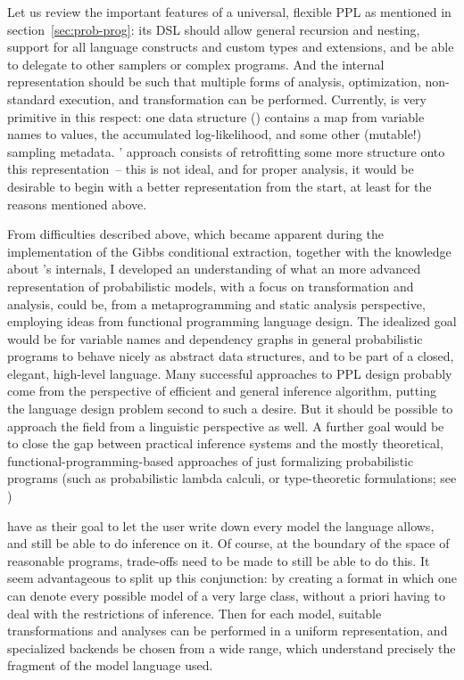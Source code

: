 Let us review the important features of a universal, flexible PPL as mentioned in
section~\ref{sec:prob-prog}: its DSL should allow general recursion and nesting, support for all
language constructs and custom types and extensions, and be able to delegate to other samplers or
complex programs.  And the internal representation should be such that multiple forms of analysis,
optimization, non-standard execution, and transformation can be performed.  Currently, \turingjl{}
is very primitive in this respect: one data structure () contains a map from variable
names to values, the accumulated log-likelihood, and some other (mutable!) sampling
metadata. \autogibbsjl{}' approach consists of retrofitting some more structure onto this
representation~-- this is not ideal, and for proper analysis, it would be desirable to begin with a
better representation from the start, at least for the reasons mentioned above.

From difficulties described above, which became apparent during the implementation of the Gibbs
conditional extraction, together with the knowledge about \dppljl{}'s internals, I developed an
understanding of what an more advanced representation of probabilistic models, with a focus on
transformation and analysis, could be, from a metaprogramming and static analysis perspective,
employing ideas from functional programming language design.  The idealized goal would be for
variable names and dependency graphs in general probabilistic programs to behave nicely as abstract
data structures, and to be part of a closed, elegant, high-level language.  Many successful
approaches to PPL design probably come from the perspective of efficient and general inference
algorithm, putting the language design problem second to such a desire.  But it should be possible
to approach the field from a linguistic perspective as well.  A further goal would be to close the
gap between practical inference systems and the mostly theoretical, functional-programming-based
approaches of just formalizing probabilistic programs (such as probabilistic lambda calculi, or
type-theoretic formulations; see
\textcite{ramsey2002stochastic,heunen2017convenient,bhat2012type,scibior2015practical})

 have as their goal to let the user write down every model the language
allows, and still be able to do inference on it.  Of course, at the boundary of the space of
reasonable programs, trade-offs need to be made to still be able to do this.  It seem advantageous to
split up this conjunction: by creating a format in which one can denote every possible model of a
very large class, without a priori having to deal with the restrictions of inference.  Then for each
model, suitable transformations and analyses can be performed in a uniform representation, and
specialized backends be chosen from a wide range, which understand precisely the fragment of the
model language used.

